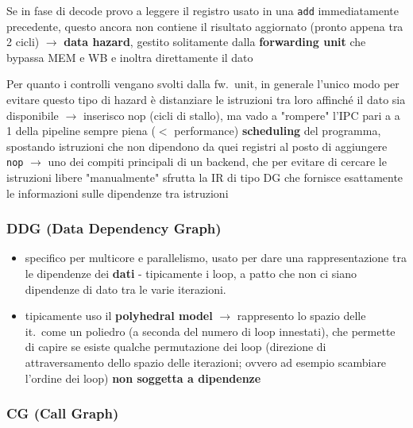 \begin{example}[frametitle={Esempio: risultato di una \lstinline|add|}]
   Se in fase di decode provo a leggere il registro usato in una \lstinline|add| immediatamente precedente, questo ancora non contiene il risultato aggiornato (pronto appena tra 2 cicli) $\rightarrow$ \textbf{data hazard}, gestito solitamente dalla \textbf{forwarding unit} che bypassa MEM e WB e inoltra direttamente il dato 
\end{example}

\begin{emphasize}[frametitle={Soluzione generica (inefficiente)}]
  Per quanto i controlli vengano svolti dalla fw.~unit, in generale l'unico modo per evitare questo tipo di hazard \`e distanziare le istruzioni tra loro affinch\'e il dato sia disponibile $\rightarrow$ inserisco nop (cicli di stallo), ma vado a "rompere" l'IPC pari a a 1 della pipeline sempre piena ($<$ performance)
  \textbf{scheduling} del programma, spostando istruzioni che non dipendono da quei registri al posto di aggiungere \lstinline|nop| $\rightarrow$ uno dei compiti principali di un backend, che per evitare di cercare le istruzioni libere "manualmente" sfrutta la IR di tipo DG che fornisce esattamente le informazioni sulle dipendenze tra istruzioni
\end{emphasize}

\subsubsection{DDG (Data Dependency Graph)}

\begin{itemize}
  \item specifico per multicore e parallelismo, usato per dare una rappresentazione tra le dipendenze dei \textbf{dati} - tipicamente i loop, a patto che non ci siano dipendenze di dato tra le varie iterazioni.
  \item tipicamente uso il \textbf{polyhedral model} $\rightarrow$ rappresento lo spazio delle it.~come un poliedro (a seconda del numero di loop innestati), che permette di capire se esiste qualche permutazione dei loop (direzione di attraversamento dello spazio delle iterazioni; ovvero ad esempio scambiare l'ordine dei loop) \textbf{non soggetta a dipendenze}
\end{itemize}

\subsubsection{CG (Call Graph)}

